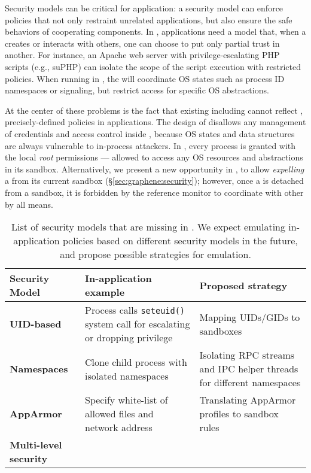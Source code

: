 Security models can be critical for application:
a security model can enforce policies that not only restraint unrelated applications,
but also ensure the safe behaviors of cooperating components.
In \liboses{}, applications need a model that,
when a \picoproc{} creates or interacts with others,
one can choose to put only partial trust in another.
For instance,
an Apache web server with privilege-escalating PHP scripts (e.g., suPHP)
can isolate the scope of
the script execution
with restricted policies.
When running in \graphene{},
the \picoprocs{} will coordinate OS states such as process ID namespaces or signaling,
but restrict access for specific OS abstractions. 




At the center of these problems is the fact that existing \liboses{} including \graphene{}
cannot reflect ,
precisely-defined policies in applications.
The design of \picoprocs{} disallows any management of credentials and access control inside \liboses{},
because OS states and data structures are always
vulnerable to in-process attackers. %
In \graphene{}, every process is granted with the local \emph{root} permissions
--- allowed to access any OS resources and abstractions
in its sandbox.
Alternatively, we present a new opportunity in \graphene{},
to allow \emph{expelling} a \picoproc{} from its current sandbox (\S\ref{sec:graphene:security});
however, once a \picoproc{} is detached from a sandbox,
it is forbidden by the reference monitor to coordinate with other \picoprocs{}
by all means.


\begin{table}[t]
\footnotesize
\centering
\begin{tabular}{>{\bf}p{1.2in}>{\raggedright\arraybackslash}p{2.4in}>{\raggedright\arraybackslash}p{2.4in}}
\toprule
{\bf Security Model} & {\bf In-application example} & {\bf Proposed strategy} \\
\midrule
UID-based & Process calls {\tt seteuid()} system call for escalating or dropping privilege & Mapping UIDs/GIDs to sandboxes \\
\midrule
Namespaces & Clone child process with isolated namespaces & Isolating RPC streams and IPC helper threads for different namespaces \\
\midrule
AppArmor & Specify white-list of allowed files and network address & Translating AppArmor profiles to sandbox rules \\
\midrule
Multi-level security &  &  \\
\bottomrule
\end{tabular}
\caption[List of security models to be added in \graphene{} as future works]
{List of security models that are missing in \graphene{}.
We expect emulating in-application policies based on different security models in the future, and propose possible strategies for emulation.
}
\label{tab:future:security}
\end{table}


